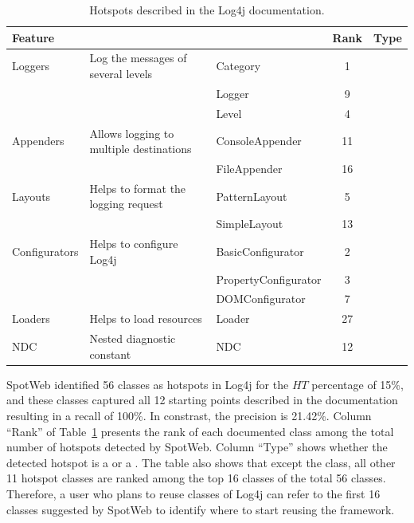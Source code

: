\setlength{\tabcolsep}{1pt}
\begin{table}[t]
\begin{CodeOut}
\begin{center}
\begin {tabular} {|l|l|l|c|c|}
\hline
Feature&\CenterCell{Description}&\CenterCell{Class}&Rank&Type\\
\hline Loggers&Log the messages of several levels&Category&1&\CodeIn{TEMPLATE}\\
\hline &&Logger&9&\CodeIn{HOOK}\\
\hline &&Level&4&\CodeIn{HOOK}\\
\hline Appenders&Allows logging to multiple destinations&ConsoleAppender&11&\CodeIn{TEMPLATE}\\
\hline &&FileAppender&16&\CodeIn{TEMPLATE}\\
\hline Layouts&Helps to format the logging request&PatternLayout&5&\CodeIn{TEMPLATE}\\
\hline &&SimpleLayout&13&\CodeIn{TEMPLATE}\\
\hline Configurators&Helps to configure Log4j&BasicConfigurator&2&\CodeIn{TEMPLATE}\\
\hline &&PropertyConfigurator&3&\CodeIn{TEMPLATE}\\
\hline &&DOMConfigurator&7&\CodeIn{TEMPLATE}\\
\hline Loaders&Helps to load resources&Loader&27&\CodeIn{TEMPLATE}\\
\hline NDC&Nested diagnostic constant&NDC&12&\CodeIn{TEMPLATE}\\
\hline
\end{tabular}
\centering \caption {\label{tab:hdresults} Hotspots described in the Log4j documentation.}
\end{center}
\end{CodeOut}
\end{table}

SpotWeb identified 56 classes as hotspots in Log4j for
the $HT$ percentage of 15\%, and these classes captured 
all 12 starting points described in the
documentation resulting in a recall of 100\%. In constrast, the
precision is 21.42\%.  Column ``Rank'' of Table~\ref{tab:hdresults} presents the rank 
of each documented class among the total number of 
hotspots detected by SpotWeb. Column ``Type'' shows
whether the detected hotspot is a  or a
. The table also shows that except the
 class, all other 11 hotspot classes are ranked among
the top 16 classes of the total 56 classes. Therefore, a user who
plans to reuse classes of Log4j can refer to the first 16
classes suggested by SpotWeb to identify where to start reusing the
framework.

